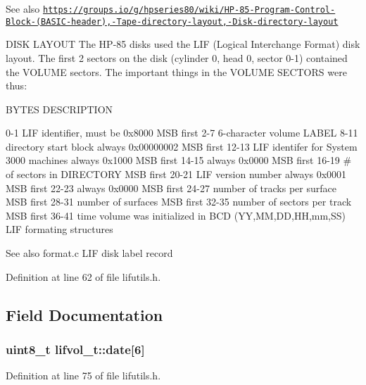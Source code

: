 \begin{DoxySeeAlso}{See also}
\href{https://groups.io/g/hpseries80/wiki/HP-85-Program-Control-Block-(BASIC-header),-Tape-directory-layout,-Disk-directory-layout}{\tt https\+://groups.\+io/g/hpseries80/wiki/\+H\+P-\/85-\/\+Program-\/\+Control-\/\+Block-\/(\+B\+A\+S\+I\+C-\/header),-\/\+Tape-\/directory-\/layout,-\/\+Disk-\/directory-\/layout}
\end{DoxySeeAlso}
D\+I\+SK L\+A\+Y\+O\+UT The H\+P-\/85 disks used the L\+IF (Logical Interchange Format) disk layout. The first 2 sectors on the disk (cylinder 0, head 0, sector 0-\/1) contained the V\+O\+L\+U\+ME sectors. The important things in the V\+O\+L\+U\+ME S\+E\+C\+T\+O\+RS were thus\+:

B\+Y\+T\+ES D\+E\+S\+C\+R\+I\+P\+T\+I\+ON 

 0-\/1 L\+IF identifier, must be 0x8000 M\+SB first 2-\/7 6-\/character volume L\+A\+B\+EL 8-\/11 directory start block always 0x00000002 M\+SB first 12-\/13 L\+IF identifer for System 3000 machines always 0x1000 M\+SB first 14-\/15 always 0x0000 M\+SB first 16-\/19 \# of sectors in D\+I\+R\+E\+C\+T\+O\+RY M\+SB first 20-\/21 L\+IF version number always 0x0001 M\+SB first 22-\/23 always 0x0000 M\+SB first 24-\/27 number of tracks per surface M\+SB first 28-\/31 number of surfaces M\+SB first 32-\/35 number of sectors per track M\+SB first 36-\/41 time volume was initialized in B\+CD (YY,MM,DD,HH,mm,SS) L\+IF formating structures \begin{DoxySeeAlso}{See also}
format.\+c L\+IF disk label record 
\end{DoxySeeAlso}


Definition at line 62 of file lifutils.\+h.



\subsection{Field Documentation}
\subsubsection[{\texorpdfstring{date}{date}}]{\setlength{\rightskip}{0pt plus 5cm}uint8\+\_\+t lifvol\+\_\+t\+::date\mbox{[}6\mbox{]}}\hypertarget{structlifvol__t_a41f630e7211326270dc6e72a55f94516}{}\label{structlifvol__t_a41f630e7211326270dc6e72a55f94516}


Definition at line 75 of file lifutils.\+h.



